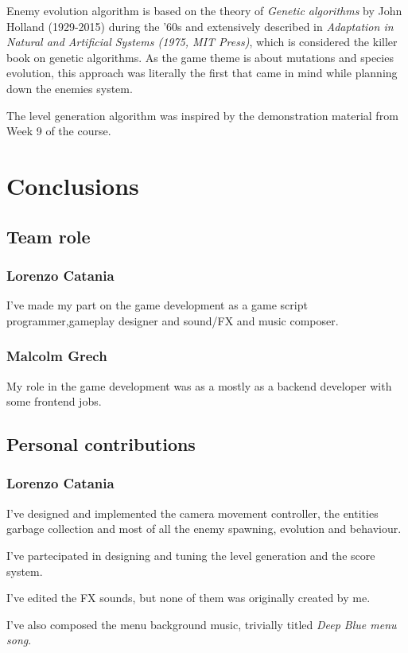 \documentclass[11pt]{article}
\begin{document}
Enemy evolution algorithm is based on the theory of \textit{Genetic algorithms} by John Holland (1929-2015) during the '60s and extensively described in \textit{Adaptation in Natural and Artificial Systems (1975, MIT Press)}, which is considered the killer book on genetic algorithms. As the game theme is about mutations and species evolution, this approach was literally the first that came in mind while planning down the enemies system.

The level generation algorithm was inspired by the demonstration material from Week 9 of the course.

\section{Conclusions}
\subsection{Team role}
\subsubsection{Lorenzo Catania}
I've made my part on the game development as a game script programmer,gameplay designer and sound/FX and music composer.

\subsubsection{Malcolm Grech}
My role in the game development was as a mostly as a backend developer with some frontend jobs.

\subsection{Personal contributions}
\subsubsection{Lorenzo Catania}
I've designed and implemented the camera movement controller, the entities garbage collection and most of all the enemy spawning, evolution and behaviour.

I've partecipated in designing and tuning the level generation and the score system.

I've edited the FX sounds, but none of them was originally created by me.

I've also composed the menu background music, trivially titled \textit{Deep Blue menu song}.
\end{document}
